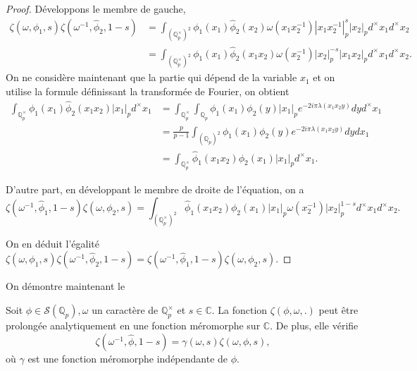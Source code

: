 \begin{proof}
Développons le membre de gauche,
\begin{align}
\zeta(\omega, \phi_1, s)\zeta(\omega^{-1}, \hat{\phi}_2, 1-s) &= \int_{{(\mathbb{Q}_p^\times)}^2} \phi_1(x_1)\hat{\phi}_2(x_2)\omega(x_1x_2^{-1})|x_1x_2^{-1}|_p^s|x_2|_p d^\times x_1 d^\times x_2 \\
&= \int_{{(\mathbb{Q}_p^\times)}^2} \phi_1(x_1)\hat{\phi}_2(x_1x_2)\omega(x_2^{-1})|x_2|_p^{-s}|x_1x_2|_p d^\times x_1 d^\times x_2.
\end{align}
On ne considère maintenant que la partie qui dépend de la variable $x_1$ et on utilise la formule définissant la transformée de Fourier, on obtient
\begin{align}
\int_{\mathbb{Q}_p^\times} \phi_1(x_1)\hat{\phi}_2(x_1x_2)|x_1|_p d^\times x_1 &=\int_{\mathbb{Q}_p^\times} \int_{\mathbb{Q}_p} \phi_1(x_1) \phi_2(y)|x_1|_p e^{-2i\pi \lambda(x_1x_2 y)} dy d^\times x_1 \\
&= \frac{p}{p-1}\int_{{(\mathbb{Q}_p)}^2} \phi_1(x_1)\phi_2(y) e^{-2i\pi \lambda(x_1x_2 y)} dy dx_1 \\
&= \int_{\mathbb{Q}_p^\times} \hat{\phi}_1(x_1x_2)\phi_2(x_1)|x_1|_p d^\times x_1.
\end{align}

D'autre part, en développant le membre de droite de l'équation, on a
\begin{equation}
\zeta(\omega^{-1}, \hat{\phi}_1, 1-s)\zeta(\omega, \phi_2, s) =  \int_{{(\mathbb{Q}_p^\times)}^2} \hat{\phi}_1(x_1x_2)\phi_2(x_1)|x_1|_p \omega(x_2^{-1})|x_2|_p^{1-s} d^\times x_1 d^\times x_2.
\end{equation}

On en déduit l'égalité $\zeta(\omega, \phi_1, s)\zeta(\omega^{-1}, \hat{\phi}_2, 1-s) = \zeta(\omega^{-1}, \hat{\phi}_1, 1-s)\zeta(\omega, \phi_2, s)$.
\end{proof}

On démontre maintenant le
\begin{theoreme}
Soit $\phi \in \mathcal{S}(\mathbb{Q}_p), \omega$ un caractère de $\mathbb{Q}_p^\times$ et $s \in \mathbb{C}$. La fonction $\zeta(\phi, \omega, .)$ peut être prolongée analytiquement en une fonction méromorphe sur $\mathbb{C}$. De plus, elle vérifie
\begin{equation}
\label{eq_gl1}
\zeta(\omega^{-1}, \hat{\phi},  1-s)=\gamma(\omega, s)\zeta(\omega,\phi, s),
\end{equation}
où $\gamma$ est une fonction méromorphe indépendante de $\phi$.
\end{theoreme}

